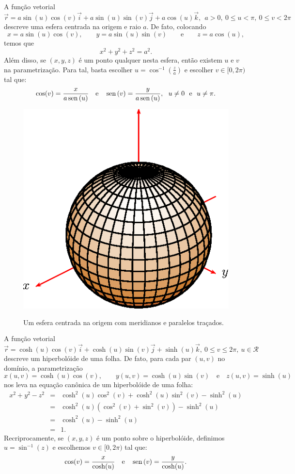 \begin{ex}A função vetorial
$$
\vec{r}=a\sin(u)\cos(v)\vec{i}+a\sin(u)\sin(v)\vec{j}+a\cos(u)\vec{k},~~ a>0, ~ 0\leq u< \pi, ~ 0\leq v< 2\pi
$$
descreve uma esfera centrada na origem e raio $a$. De fato, colocando $$x=a\sin(u)\cos(v),\qquad y=a\sin(u)\sin(v)\qquad\text{e}\qquad z=a\cos(u),$$
temos que
$$
x^2+y^2+z^2=a^2.
$$
Além disso, se $(x,y,z)$ é um ponto qualquer nesta esfera, então existem $u$ e $v$ na parametrização. Para tal, basta escolher $u=\cos^{-1}\left(\frac{z}{a}\right)$ e escolher $v\in[0,2\pi)$ tal que:
$$\cos(v)=\frac{x}{a\sin(u)} \quad \hbox{e} \quad \sin(v)=\frac{y}{a\sin(u)},~~u\neq 0 ~~ \hbox{e} ~~u\neq \pi.$$

 \begin{figure}%
\centering
 \includegraphics{cap_superficies/figs/figura_1}\label{cap_superficies_esfera}
\caption{Um esfera centrada na origem com meridianos e paralelos traçados.}
\end{figure}
\end{ex}

\begin{ex}A função vetorial
 $$
 \vec{r}=\cosh(u)\cos( v)\vec{i}+ \cosh(u)\sin(v)\vec{j}+\sinh(u)\vec{k},\ 0\leq v\leq 2\pi,\ u\in\mathcal{R}
 $$
 descreve um hiperbolóide de uma folha. De fato, para cada par $(u,v)$ no domínio, a parametrização
 $$
 x(u,v)=\cosh(u)\cos(v),\qquad y(u,v)=\cosh(u)\sin(v)\quad\text{e}\quad z(u,v)=\sinh(u)
 $$
 nos leva na equação canônica de um hiperbolóide de uma folha:
 \begin{eqnarray*}
 x^2+y^2-z^2&=&\cosh^2(u)\cos^2(v)+\cosh^2(u)\sin^2(v)-\sinh^2(u)  \\
 &=&\cosh^2(u)(\cos^2(v)+\sin^2(v))-\sinh^2(u)  \\
 &=&\cosh^2(u)-\sinh^2(u)  \\
 &=&1.
 \end{eqnarray*}
Recriprocamente, se $(x,y,z)$ é um ponto sobre o hiperbolóide, definimos $u=\sin^{-1}(z)$ e escolhemos $v\in[0,2\pi)$ tal que:
$$\cos(v)=\frac{x}{\cosh(u)} \quad \hbox{e} \quad \sin(v)=\frac{y}{\cosh(u)}.$$
 \end{ex}
 
